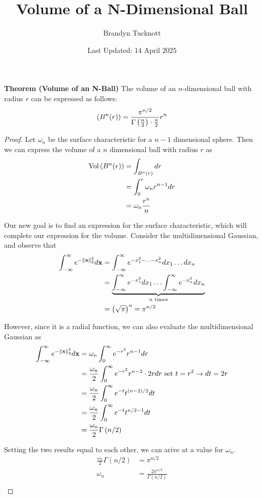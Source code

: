 \documentclass{exam}
\title{Volume of a N-Dimensional Ball}
\author{Brandyn Tucknott}
\date{Last Updated: 14 April 2025}
\begin{document}
\maketitle

\textbf{Theorem (Volume of an N-Ball)} The volume of an 
$n$-dimensional ball with radius $r$ can be expressed as follows:
$$\text{($B^n(r)$)} = \frac{\pi^{n / 2}}{\Gamma \left( \frac{n}{2} \right)\cdot \frac{n}{2}}r^n$$

\begin{proof}
    Let $\omega_n$ be the surface characteristic for a $n - 1$ dimensional 
    sphere. Then we can express the volume of a $n$ dimensional ball with radius $r$
    as
    \begin{align*}
        \text{Vol}\left( B^n(r) \right) &= \int_{B^n(r)}dr \\
        &= \int_0^r \omega_n r^{n - 1}dr \\
        &= \omega_n \frac{r^n}{n}
    \end{align*}

    Our new goal is to find an expression for the surface characteristic, which will
    complete our expression for the volume. Consider the multidimensional Gaussian,
    and observe that
    \begin{align*}
        \int_{-\infty}^\infty e^{-\left\| \mathbf{x} \right\|_2^2} d\mathbf{x} &= \int_{-\infty}^\infty e^{-x_1^2 - \hdots - x_n^2}dx_1\hdots dx_n \\
        &= \underbrace{\int_{-\infty}^\infty e^{-x_1^2} dx_1 \hdots \int_{-\infty}^\infty e^{-x_n^2}dx_n}_{n \text{ times}} \\
        &= \left( \sqrt{\pi} \right)^n = \pi^{n / 2}
    \end{align*}

    However, since it is a radial function, we can also evaluate the 
    multidimensional Gaussian as
    \begin{align*}
        \int_{-\infty}^\infty e^{-\left\| \mathbf{x} \right\|_2^2} d\mathbf{x} &= \omega_n \int_0^\infty e^{-r^2}r^{n - 1} dr \\
        &= \frac{\omega_n}{2} \int_0^\infty e^{-r^2} r^{n - 2}\cdot 2r dr \text{ set $t = r^2 \rightarrow dt = 2r$} \\
        &= \frac{\omega_n}{2} \int_0^\infty e^{-t} t^{(n - 2) / 2} dt \\
        &= \frac{\omega_n}{2} \int_0^\infty e^{-t}t^{n / 2 - 1} dt \\
        &= \frac{\omega_n}{2} \Gamma\left( n / 2 \right)
    \end{align*}

    Setting the two results equal to each other, we can arive at a value for $\omega_n$.
    \begin{align*}
        \frac{\omega_n}{2} \Gamma (n / 2) &= \pi^{n / 2} \\
        \omega_n &= \frac{2\pi^{n / 2}}{\Gamma (n / 2)} \\
    \end{align*}


\end{proof}
\end{document}
